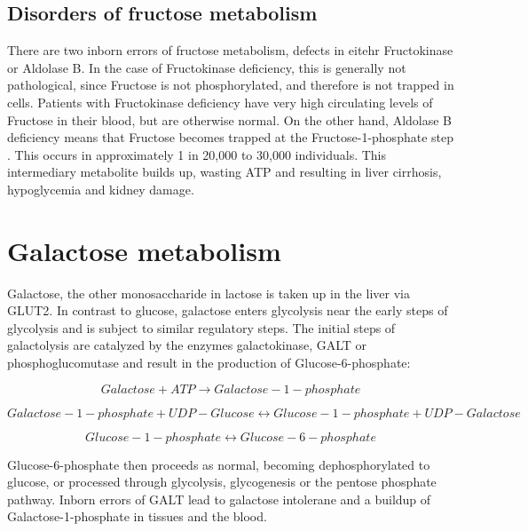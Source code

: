 \documentclass{tufte-handout}
\begin{document}
\subsection{Disorders of fructose metabolism}

There are two inborn errors of fructose metabolism, defects in eitehr Fructokinase or Aldolase B.  In the case of Fructokinase deficiency, this is generally not pathological, since Fructose is not phosphorylated, and therefore is not trapped in cells.  Patients with Fructokinase deficiency have very high circulating levels of Fructose in their blood, but are otherwise normal.  On the other hand, Aldolase B deficiency means that Fructose becomes trapped at the Fructose-1-phosphate step \citep{Cross1988}.  This occurs in approximately 1 in 20,000 to 30,000 individuals.  This intermediary metabolite builds up, wasting ATP and resulting in liver cirrhosis, hypoglycemia and kidney damage.

\section{Galactose metabolism}

Galactose, the other monosaccharide in lactose is taken up in the liver via GLUT2.  In contrast to glucose, galactose enters glycolysis near the early steps of glycolysis and is subject to similar regulatory steps.  The initial steps of galactolysis are catalyzed by the enzymes galactokinase, GALT or phosphoglucomutase and result in the production of Glucose-6-phosphate:

\begin{equation}
Galactose + ATP \rightarrow Galactose-1-phosphate
\end{equation}

\begin{equation}
Galactose-1-phosphate + UDP-Glucose \leftrightarrow Glucose-1-phosphate + UDP-Galactose
\end{equation}

\begin{equation}
Glucose-1-phosphate \leftrightarrow Glucose-6-phosphate
\end{equation}

Glucose-6-phosphate then proceeds as normal, becoming dephosphorylated to glucose, or processed through glycolysis, glycogenesis or the pentose phosphate pathway.  Inborn errors of GALT lead to galactose intolerane and a buildup of Galactose-1-phosphate in tissues and the blood.



\end{document}
